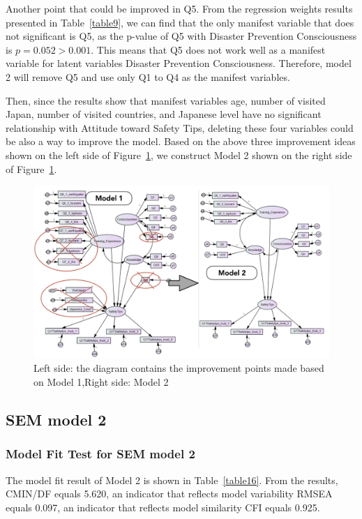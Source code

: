 Another point that could be improved in Q5. From the regression weights results presented in Table~\ref{table9}, we can find that the only manifest variable that does not significant is Q5, as the p-value of Q5 with Disaster Prevention Consciousness is $p=0.052>0.001$. This means that Q5 does not work well as a manifest variable for latent variables Disaster Prevention Consciousness. Therefore, model 2 will remove Q5 and use only Q1 to Q4 as the manifest variables.

Then, since the results show that manifest variables age, number of visited Japan, number of visited countries, and Japanese level have no significant relationship with Attitude toward Safety Tips, deleting these four variables could be also a way to improve the model. 
Based on the above three improvement ideas shown on the left side of Figure~\ref{fig25}, we construct Model 2 shown on the right side of Figure~\ref{fig25}.

\begin{figure}[t]
  \includegraphics[width=\linewidth]{Figure/Figure25.png}
  \centering
  \caption[SEM model 2]{Left side: the diagram contains the improvement points made based on Model 1,Right side: Model 2}
  \label{fig25}
\end{figure}




\subsection{SEM model 2}

\subsubsection{Model Fit Test for SEM model 2}
The model fit result of Model 2 is shown in Table~\ref{table16}. From the results, CMIN/DF equals 5.620, an indicator that reflects model variability RMSEA equals 0.097, an indicator that reflects model similarity CFI equals 0.925.

